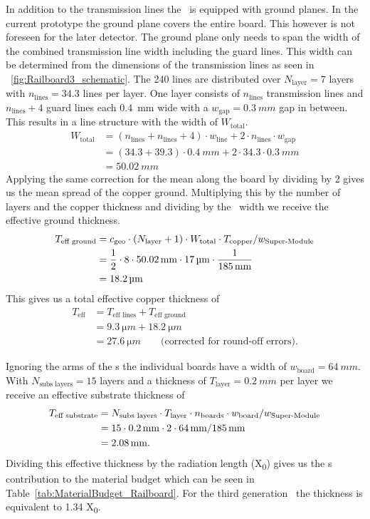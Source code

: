 \documentclass[../BTOF_summary.tex]{subfiles}
\begin{document}
In addition to the transmission lines the \railboard\ is equipped with ground planes.
In the current prototype the ground plane covers the entire board.
This however is not foreseen for the later detector.
The ground plane only needs to span the width of the combined transmission line width including the guard lines.
This width can be determined from the dimensions of the transmission lines as seen in \fig~\ref{fig:Railboard3_schematic}.
The 240 lines are distributed over $N_\text{layer} = 7$ layers with $n_\text{lines} = 34.3$ lines per layer.
One layer consists of $n_\text{lines}$ transmission lines and $n_\text{lines}+4$ guard lines each \SI{0.4}{mm} wide with a $w_\text{gap} = \SI{0.3}{mm}$ gap in between.
This results in a line structure with the width of $W_\text{total}$.
\begin{align}
	W_\text{total} 	&= \left(n_\text{lines} + n_\text{lines} + 4\right) \cdot w_\text{line} + 2 \cdot n_\text{lines} \cdot w_\text{gap} \\
	 	&= \left(34.3 + 39.3\right) \cdot \SI{0.4}{mm} + 2 \cdot 34.3 \cdot \SI{0.3}{mm} \\
					&= \SI{50.02}{mm}
\end{align}
Applying the same correction for the mean along the board by dividing by 2 gives us the mean spread of the copper ground.
Multiplying this by the number of layers and the copper thickness and dividing by the \sm\ width we receive the effective ground thickness.
\begin{align}
	T_{\text{eff ground}} &= c_\text{geo} \cdot \left(N_\text{layer} + 1 \right) \cdot W_\text{total} \cdot T_\text{copper} / w_\text{Super-Module} \\
	&= \frac{1}{2} \cdot 8 \cdot \SI{50.02}{mm} \cdot \SI{17}{\micro m} \cdot \frac{1}{\SI{185}{mm}} \\
	&= \SI{18.2}{\micro m}
\end{align}
This gives us a total effective copper thickness of
\begin{align}
	T_\text{eff} &= T_\text{eff lines} + T_\text{eff ground} \\
	&= \SI{9.3}{\micro m} + \SI{18.2}{\micro m} \\
	&= \SI{27.6}{\micro m} \qquad \text{(corrected for round-off errors)}.
\end{align}

Ignoring the arms of the \railboard s the individual boards have a width of $w_\text{board} = \SI{64}{mm}$.
With $N_\text{subs layers} = 15$ layers and a thickness of $T_\text{layer} = \SI{0.2}{mm}$ per layer we receive an effective substrate thickness of
\begin{align}
	T_\text{eff substrate} &= N_\text{subs layers} \cdot T_\text{layer} \cdot n_\text{boards} \cdot w_\text{board} / w_\text{Super-Module} \\
	&= 15 \cdot \SI{0.2}{mm} \cdot 2 \cdot \SI{64}{mm} / \SI{185}{mm} \\
	&= \SI{2.08}{mm} . 
\end{align}
Dividing this effective thickness by the radiation length (X\textsubscript{0}) gives us the \railboard s contribution to the material budget which can be seen in Table~\ref{tab:MaterialBudget_Railboard}.
For the third generation \railboard\ the thickness is equivalent to 1.34 X\textsubscript{0}.
\end{document}

